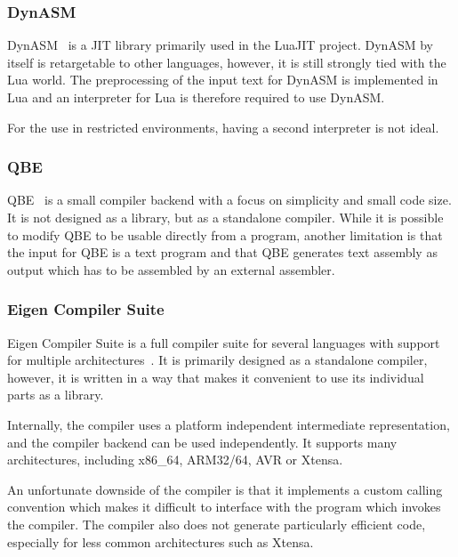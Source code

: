 \subsubsection{DynASM}

DynASM~\cite{dynasm} is a JIT library primarily used in the LuaJIT project. DynASM by itself is retargetable to other languages, however, it is still strongly tied with the Lua world. The preprocessing of the input text for DynASM is implemented in Lua and an interpreter for Lua is therefore required to use DynASM.

For the use in restricted environments, having a second interpreter is not ideal.


\subsubsection{QBE}

QBE~\cite{qbe} is a small compiler backend with a focus on simplicity and small code size. It is not designed as a library, but as a standalone compiler. While it is possible to modify QBE to be usable directly from a program, another limitation is that the input for QBE is a text program and that QBE generates text assembly as output which has to be assembled by an external assembler.


\subsubsection{Eigen Compiler Suite}

Eigen Compiler Suite is a full compiler suite for several languages with support for multiple architectures~\cite{ecs}. It is primarily designed as a standalone compiler, however, it is written in a way that makes it convenient to use its individual parts as a library.

Internally, the compiler uses a platform independent intermediate representation, and the compiler backend can be used independently. It supports many architectures, including x86\_64, ARM32/64, AVR or Xtensa.

An unfortunate downside of the compiler is that it implements a custom calling convention which makes it difficult to interface with the program which invokes the compiler. The compiler also does not generate particularly efficient code, especially for less common architectures such as Xtensa.
